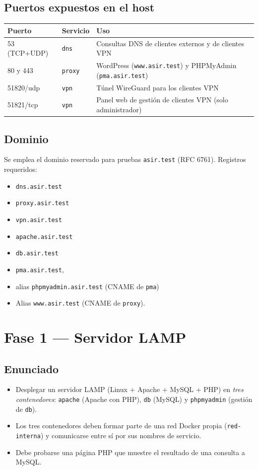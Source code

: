 \documentclass[11pt]{article}
\begin{document}
\subsection{Puertos expuestos en el host}
\label{sec:org0000009}

\begin{center}
\begin{tabular}{lll}
Puerto & Servicio & Uso\\
\hline
53 (TCP+UDP) & \texttt{dns} & Consultas DNS de clientes externos y de clientes VPN\\
80 y 443 & \texttt{proxy} & WordPress (\texttt{www.asir.test}) y PHPMyAdmin (\texttt{pma.asir.test})\\
51820/udp & \texttt{vpn} & Túnel WireGuard para los clientes VPN\\
51821/tcp & \texttt{vpn} & Panel web de gestión de clientes VPN (solo administrador)\\
\end{tabular}
\end{center}
\subsection{Dominio}
\label{sec:org000000c}
Se emplea el dominio reservado para pruebas \texttt{asir.test} (RFC 6761). Registros requeridos:
\begin{itemize}
\item \texttt{dns.asir.test}
\item \texttt{proxy.asir.test}
\item \texttt{vpn.asir.test}
\item \texttt{apache.asir.test}
\item \texttt{db.asir.test}
\item \texttt{pma.asir.test},
\item alias \texttt{phpmyadmin.asir.test} (CNAME de \texttt{pma})
\item Alias \texttt{www.asir.test} (CNAME de \texttt{proxy}).
\end{itemize}
\section{Fase 1 — Servidor LAMP}
\label{sec:org0000021}

\subsection{Enunciado}
\label{sec:org0000012}
\begin{itemize}
\item Desplegar un servidor LAMP (Linux + Apache + MySQL + PHP) en \emph{tres contenedores}:
\texttt{apache} (Apache con PHP), \texttt{db} (MySQL) y \texttt{phpmyadmin} (gestión de \texttt{db}).
\item Los tres contenedores deben formar parte de una red Docker propia (\texttt{red-interna})
y comunicarse entre sí por sus nombres de servicio.
\item Debe probarse una página PHP que muestre el resultado de una consulta a MySQL.
\end{itemize}
\end{document}
